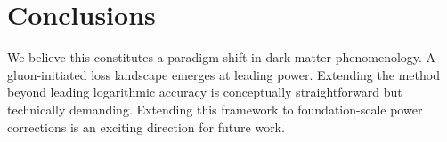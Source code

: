 \section{Conclusions}\label{sec:conclusions}

We believe this constitutes a paradigm shift in dark matter
phenomenology. A gluon-initiated loss landscape emerges at leading
power. Extending the method beyond leading logarithmic accuracy is
conceptually straightforward but technically demanding. Extending this
framework to foundation-scale power corrections is an exciting direction
for future work.

